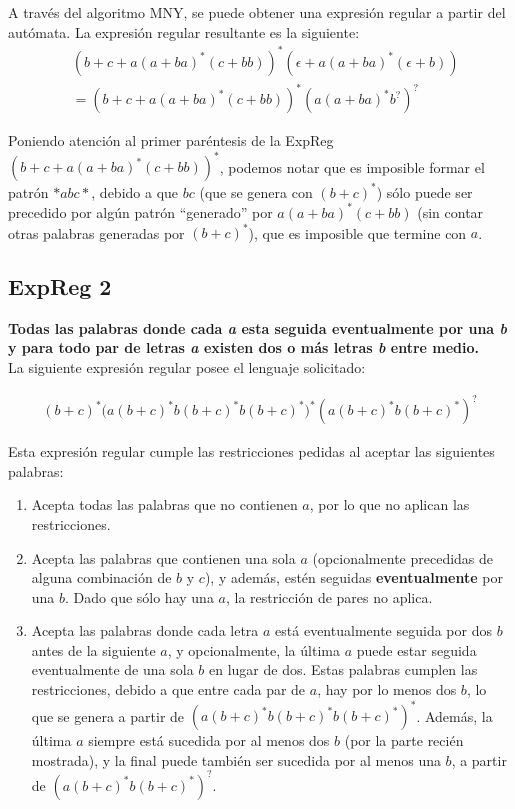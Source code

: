\documentclass[letter]{article}
\begin{document}
\begin{pregunta}{1}
A través del algoritmo MNY, se puede obtener una expresión regular a partir del autómata. La expresión regular resultante es la siguiente:
\begin{align*}
    & (b + c + a(a + ba)^* (c + bb))^* ( \epsilon + a(a + ba)^* (\epsilon + b)) \\
    & = (b + c + a(a + ba)^* (c + bb))^* (a(a + ba)^* b^?)^?
\end{align*}

Poniendo atención al primer paréntesis de la ExpReg $(b + c + a(a + ba)^* (c + bb))^*$, podemos notar que es imposible formar el patrón $*abc*$, debido a que $bc$ (que se genera con $(b + c)^*$) sólo puede ser precedido por algún patrón ``generado'' por $a(a + ba)^* (c + bb)$ (sin contar otras palabras generadas por $(b + c)^*$), que es imposible que termine con $a$.

\newpage

\subsection*{ExpReg 2}
\textbf{Todas las palabras donde cada \textit{a} esta seguida eventualmente por una \textit{b} y para todo par de letras \textit{a} existen dos o más letras \textit{b} entre medio.} \\

La siguiente expresión regular posee el lenguaje solicitado:

\begin{align*}
    (b + c)^* \Big(a (b + c)^* b (b + c)^* b (b + c)^* \Big)^* (a (b + c)^* b (b + c)^*)^?
\end{align*}


Esta expresión regular cumple las restricciones pedidas al aceptar las siguientes palabras:
\begin{enumerate}
    \item Acepta todas las palabras que no contienen $a$, por lo que no aplican las restricciones.
    \item Acepta las palabras que contienen una sola $a$ (opcionalmente precedidas de alguna combinación de $b$ y $c$), y además, estén seguidas \textbf{eventualmente} por una $b$. Dado que sólo hay una $a$, la restricción de pares no aplica.
    \item Acepta las palabras donde cada letra $a$ está eventualmente seguida por dos $b$ antes de la siguiente $a$, y opcionalmente, la última $a$ puede estar seguida eventualmente de una sola $b$ en lugar de dos. Estas palabras cumplen las restricciones, debido a que entre cada par de $a$, hay por lo menos dos $b$, lo que se genera a partir de $(a (b + c)^* b (b + c)^* b (b + c)^* )^*$. Además, la última $a$ siempre está sucedida por al menos dos $b$ (por la parte recién mostrada), y la final puede también ser sucedida por al menos una $b$, a partir de $(a (b + c)^* b (b + c)^*)^?$.
\end{enumerate}
\end{pregunta}
\end{document}

